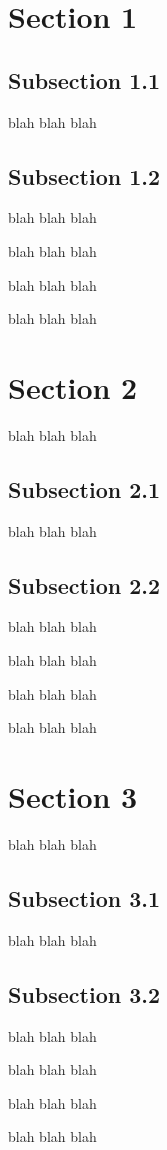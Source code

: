 \documentclass{article}
\begin{document}
\tableofcontents

\newpage
\section{Section 1}
\subsection{Subsection 1.1}
blah blah blah
\subsection{Subsection 1.2}

blah blah blah

blah blah blah

blah blah blah

blah blah blah

\section{Section 2}
blah blah blah
\subsection{Subsection 2.1}
blah blah blah
\subsection{Subsection 2.2}

blah blah blah

blah blah blah

blah blah blah

blah blah blah

\section{Section 3}
blah blah blah
\subsection{Subsection 3.1}
blah blah blah
\subsection{Subsection 3.2}

blah blah blah

blah blah blah

blah blah blah

blah blah blah
\end{document}
